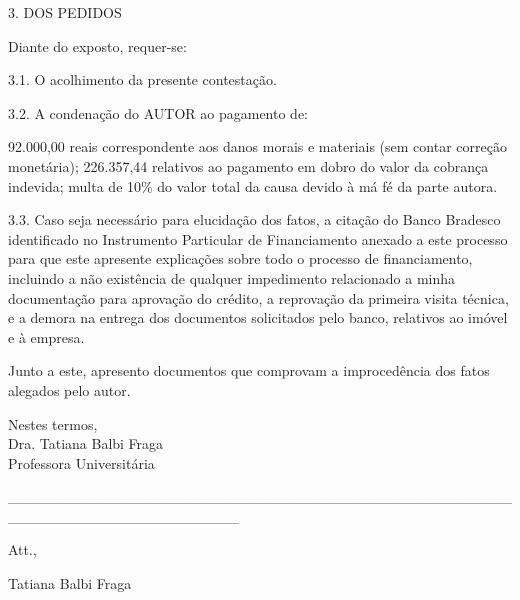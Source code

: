 \documentclass[11pt]{letter}
\begin{document}
3. DOS PEDIDOS

Diante do exposto, requer-se:

3.1. O acolhimento da presente contestação.

3.2. A condenação do AUTOR ao pagamento de:

	92.000,00 reais correspondente aos danos morais e materiais (sem contar correção monetária);
	226.357,44 relativos ao pagamento em dobro do valor da cobrança indevida;
	multa de 10\% do valor total da causa devido à má fé da parte autora.
	
3.3. Caso seja necessário para elucidação dos fatos, a citação do Banco Bradesco identificado no Instrumento Particular de Financiamento anexado a este processo para que este apresente explicações sobre todo o processo de financiamento, incluindo a não existência de qualquer impedimento relacionado a minha documentação para aprovação do crédito, a reprovação da primeira visita técnica, e a demora na entrega dos documentos solicitados pelo banco, relativos ao imóvel e à empresa. 

	
Junto a este, apresento documentos que comprovam a improcedência dos fatos alegados pelo autor.

Nestes termos, \\
Dra. Tatiana Balbi Fraga \\
Professora Universitária

\begin{center}
             \_\_\_\_\_\_\_\_\_\_\_\_\_\_\_\_\_\_\_\_\_\_\_\_\_\_\_\_\_\_\_\_\_\_\_\_\_\_\_\_\_\_\_\_\_\_\_\_\_\_\_\_\_\_\_\_\_\_\_\_\_\_\_\_\_\_\_\_\_\_
    
\end{center}  
          
Att.,

Tatiana Balbi Fraga
\end{document}
